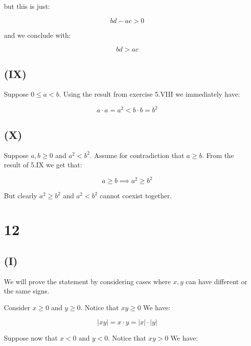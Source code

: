 \documentclass{article}
\begin{document}
but this is just:

\begin{equation*}
	bd - ac > 0
\end{equation*}

and we conclude with:

\begin{equation*}
	bd > ac
\end{equation*}

\subsection*{(IX)}

Suppose \(0 \leq a < b\). Using the result from exercise 5.VIII we immediately have:

\begin{equation*}
	a \cdot a = a^{2} < b \cdot b = b^{2}
\end{equation*}

\subsection*{(X)}

Suppose \(a, b \geq 0\) and \(a^{2} < b^{2}\). Assume for contradiction that \(a \geq b\). From the result of 5.IX we
get that:

\begin{equation*}
	a \geq b \implies a^{2} \geq b^{2}
\end{equation*}

But clearly \(a^{2} \geq b^{2}\) and \(a^{2} < b^{2}\) cannot coexist together.

\section*{12}

\subsection*{(I)}

We will prove the statement by considering cases where \(x, y\) can have different or the same signs.

Consider \(x \geq 0\) and \(y \geq 0\). Notice that \(xy \geq 0\) We have:

\begin{equation*}
	|xy| = x \cdot y = |x| \cdot |y|
\end{equation*}

Suppose now that \(x < 0\) and \(y < 0\). Notice that \(xy > 0\) We have:
\end{document}
